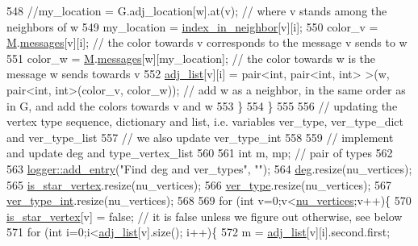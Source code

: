 \begin{DoxyCode}
548       \textcolor{comment}{//my\_location = G.adj\_location[w].at(v); // where v stands among the neighbors of w}
549       my\_location = \hyperlink{classcolored__graph_ae28fcd089f9785204d76b6a608bed54f}{index\_in\_neighbor}[v][i]; 
550       color\_v = \hyperlink{classcolored__graph_ab72c568fe12f7c849ca6bffb145aec47}{M}.\hyperlink{classgraph__message_af680c8a1755cf8d4aba389c1a3d6634e}{messages}[v][i]; \textcolor{comment}{// the color towards v corresponds to the message v sends to w}
551       color\_w = \hyperlink{classcolored__graph_ab72c568fe12f7c849ca6bffb145aec47}{M}.\hyperlink{classgraph__message_af680c8a1755cf8d4aba389c1a3d6634e}{messages}[w][my\_location]; \textcolor{comment}{// the color towards w is the message w sends towards
       v}
552       \hyperlink{classcolored__graph_a45dce16965079286cf3f41a54a1b2ea4}{adj\_list}[v][i] = pair<int, pair<int, int> >(w, pair<int, int>(color\_v, color\_w)); \textcolor{comment}{// add w as
       a neighbor, in the same order as in G, and add the colors towards v and w }
553     \}
554   \}
555 
556   \textcolor{comment}{// updating the vertex type sequence, dictionary and list, i.e. variables ver\_type, ver\_type\_dict and
       ver\_type\_list}
557   \textcolor{comment}{// we also update ver\_type\_int}
558 
559   \textcolor{comment}{// implement and update deg and type\_vertex\_list}
560   
561   \textcolor{keywordtype}{int} m, mp; \textcolor{comment}{// pair of types}
562 
563   \hyperlink{classlogger_a710163deb17bc81f70d53d285b8ac9ac}{logger::add\_entry}(\textcolor{stringliteral}{"Find deg and ver\_types"}, \textcolor{stringliteral}{""});
564   \hyperlink{classcolored__graph_ae3269d35c1b022bc70d195bebd4e1b8a}{deg}.resize(nu\_vertices);
565   \hyperlink{classcolored__graph_ad41163e970530c7e45878d299f0dc961}{is\_star\_vertex}.resize(nu\_vertices);
566   \hyperlink{classcolored__graph_a2cc32e7146fa3319f83cfa940f5e1be4}{ver\_type}.resize(nu\_vertices);
567   \hyperlink{classcolored__graph_a491ed2ea1a65118af02ec606c8d44c0a}{ver\_type\_int}.resize(nu\_vertices);
568 
569   \textcolor{keywordflow}{for} (\textcolor{keywordtype}{int} v=0;v<\hyperlink{classcolored__graph_a90ece8eb1fec52f3f41549ab527c1d5b}{nu\_vertices};v++)\{
570     \hyperlink{classcolored__graph_ad41163e970530c7e45878d299f0dc961}{is\_star\_vertex}[v] = \textcolor{keyword}{false}; \textcolor{comment}{// it is false unless we figure out otherwise, see below}
571     \textcolor{keywordflow}{for} (\textcolor{keywordtype}{int} i=0;i<\hyperlink{classcolored__graph_a45dce16965079286cf3f41a54a1b2ea4}{adj\_list}[v].size(); i++)\{
572       m = \hyperlink{classcolored__graph_a45dce16965079286cf3f41a54a1b2ea4}{adj\_list}[v][i].second.first;

\end{DoxyCode}
